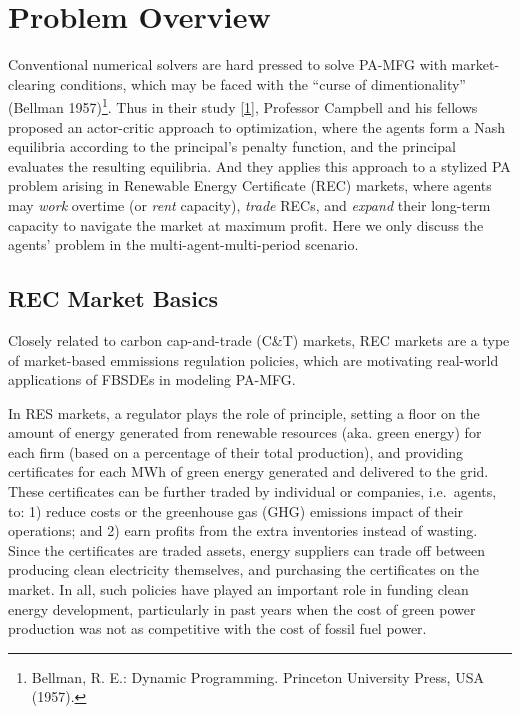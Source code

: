 \documentclass{article}
\begin{document}
\section{Problem Overview}

Conventional numerical solvers are hard pressed to solve PA-MFG with
market-clearing conditions, which may be faced with the ``curse of
dimentionality'' (Bellman 1957)\footnote{Bellman, R. E.: Dynamic
  Programming. Princeton University Press, USA (1957).}. Thus in their
study \href{\%22https://doi.org/10.48550/arXiv.2110.01127\%22}{{[}1{]}},
Professor Campbell and his fellows proposed an actor-critic approach to
optimization, where the agents form a Nash equilibria according to the
principal's penalty function, and the principal evaluates the resulting
equilibria. And they applies this approach to a stylized PA problem
arising in Renewable Energy Certificate (REC) markets, where agents may
\emph{work} overtime (or \emph{rent} capacity), \emph{trade} RECs, and
\emph{expand} their long-term capacity to navigate the market at maximum
profit. Here we only discuss the agents' problem in the
multi-agent-multi-period scenario.

\subsection{REC Market Basics}

Closely related to carbon cap-and-trade (C\&T) markets, REC markets are
a type of market-based emmissions regulation policies, which are
motivating real-world applications of FBSDEs in modeling PA-MFG.

In RES markets, a regulator plays the role of principle, setting a floor
on the amount of energy generated from renewable resources (aka. green
energy) for each firm (based on a percentage of their total production),
and providing certificates for each MWh of green energy generated and
delivered to the grid. These certificates can be further traded by
individual or companies, i.e.~agents, to: 1) reduce costs or the
greenhouse gas (GHG) emissions impact of their operations; and 2) earn
profits from the extra inventories instead of wasting. Since the
certificates are traded assets, energy suppliers can trade off between
producing clean electricity themselves, and purchasing the certificates
on the market. In all, such policies have played an important role in
funding clean energy development, particularly in past years when the
cost of green power production was not as competitive with the cost of
fossil fuel power.
\end{document}
